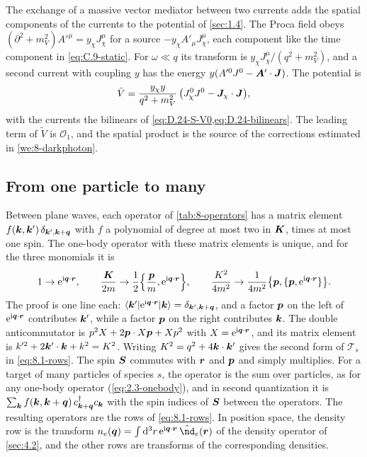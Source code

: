 The exchange of a massive vector mediator between two currents adds the spatial components of the currents to the potential of \cref{sec:1.4}. The Proca field obeys $(\partial^2 + m_V^2)A'^\mu = y_\chi J^\mu_\chi$ for a source $-y_\chi A'_\mu J^\mu_\chi$, each component like the time component in \cref{eq:C.9-static}. For $\omega \ll q$ its transform is $y_\chi J^\mu_\chi/(q^2 + m_V^2)$, and a second current with coupling $y$ has the energy $y(A'^0J^0 - \bm{A}'\cdot\bm{J})$. The potential is
\begin{equation}
  \tilde V = \frac{y_\chi y}{q^2 + m_V^2}\,\bigl(J^0_\chi J^0 - \bm{J}_\chi\cdot\bm{J}\bigr) ,
  \label{eq:D.24-vector}
\end{equation}
with the currents the bilinears of \cref{eq:D.24-S-V0,eq:D.24-bilinears}. The leading term of $\tilde V$ is $\mathcal{O}_1$, and the spatial product is the source of the corrections estimated in \cref{we:8-darkphoton}.

\subsection{From one particle to many}

Between plane waves, each operator of \cref{tab:8-operators} has a matrix element $f(\bm{k}, \bm{k}')\,\delta_{\bm{k}',\bm{k}+\bm{q}}$ with $f$ a polynomial of degree at most two in $\bm{K}$, times at most one spin. The one-body operator with these matrix elements is unique, and for the three monomials it is
\begin{equation}
  1 \to \mathrm{e}^{\mathrm{i}\bm{q}\cdot\bm{r}}, \qquad
  \frac{\bm{K}}{2m} \to \frac12\Bigl\{\frac{\bm{p}}{m}, \mathrm{e}^{\mathrm{i}\bm{q}\cdot\bm{r}}\Bigr\}, \qquad
  \frac{K^2}{4m^2} \to \frac{1}{4m^2}\bigl\{\bm{p}, \{\bm{p}, \mathrm{e}^{\mathrm{i}\bm{q}\cdot\bm{r}}\}\bigr\} .
  \label{eq:D.24-monomials}
\end{equation}
The proof is one line each: $\langle\bm{k}'|\mathrm{e}^{\mathrm{i}\bm{q}\cdot\bm{r}}|\bm{k}\rangle = \delta_{\bm{k}',\bm{k}+\bm{q}}$, and a factor $\bm{p}$ on the left of $\mathrm{e}^{\mathrm{i}\bm{q}\cdot\bm{r}}$ contributes $\bm{k}'$, while a factor $\bm{p}$ on the right contributes $\bm{k}$. The double anticommutator is $p^2X + 2\bm{p}\cdot X\bm{p} + Xp^2$ with $X = \mathrm{e}^{\mathrm{i}\bm{q}\cdot\bm{r}}$, and its matrix element is $k'^2 + 2\bm{k}'\cdot\bm{k} + k^2 = K^2$. Writing $K^2 = q^2 + 4\bm{k}\cdot\bm{k}'$ gives the second form of $\mathcal{T}_s$ in \cref{eq:8.1-rows}. The spin $\bm{S}$ commutes with $\bm{r}$ and $\bm{p}$ and simply multiplies. For a target of many particles of species $s$, the operator is the sum over particles, as for any one-body operator (\cref{eq:2.3-onebody}), and in second quantization it is $\sum_{\bm{k}}f(\bm{k}, \bm{k} + \bm{q})\,c^\dagger_{\bm{k}+\bm{q}}c_{\bm{k}}$ with the spin indices of $\bm{S}$ between the operators. The resulting operators are the rows of \cref{eq:8.1-rows}. In position space, the density row is the transform $n_e(\vect{q}) = \int\dd^3r\,\ee^{\ii\vect{q}\cdot\vect{r}}\,\op{\nd}_e(\vect{r})$ of the density operator of \cref{sec:4.2}, and the other rows are transforms of the corresponding densities.

